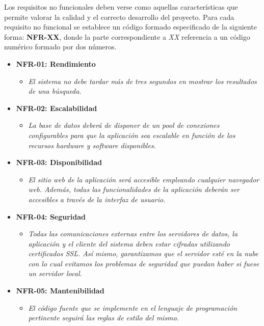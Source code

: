 \documentclass[../../main.tex]{subfiles}
\begin{document}
Los requisitos no funcionales deben verse como aquellas características que permite valorar la calidad y el correcto desarrollo del proyecto. Para cada requisito no funcional se establece un código formado especificado de la siguiente forma: \textbf{NFR-XX}, donde la parte correspondiente a \textit{XX} referencia a un código numérico formado por dos números.

\begin{itemize}
    \item \textbf{NFR-01: Rendimiento}
    \begin{itemize}
        \item \textit{El sistema no debe tardar más de tres segundos en mostrar los resultados de una búsqueda}.
    \end{itemize}
    \item \textbf{NFR-02: Escalabilidad}
    \begin{itemize}
        \item \textit{La base de datos deberá de disponer de un pool de conexiones configurables para que la aplicación sea escalable en función de los recursos hardware y software disponibles}.
    \end{itemize}
    \item \textbf{NFR-03: Disponibilidad}
    \begin{itemize}
        \item \textit{El sitio web de la aplicación será accesible empleando cualquier navegador web. Además, todas las funcionalidades de la aplicación deberán ser accesibles a través de la interfaz de usuario}.
    \end{itemize}
    \item \textbf{NFR-04: Seguridad}
    \begin{itemize}
        \item \textit{Todas las comunicaciones externas entre los servidores de datos, la aplicación y el cliente del sistema deben estar cifradas utilizando certificados SSL. Así mismo, garantizamos que el servidor esté en la nube con lo cual evitamos los problemas de seguridad que puedan haber si fuese un servidor local}.
    \end{itemize}
    \item \textbf{NFR-05: Mantenibilidad}
    \begin{itemize}
        \item \textit{El código fuente que se implemente en el lenguaje de programación pertinente seguirá las reglas de estilo del mismo}.
    \end{itemize}

\end{itemize}
\end{document}

